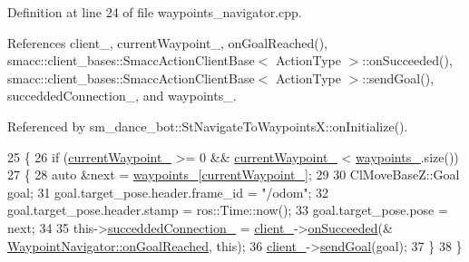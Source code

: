 Definition at line 24 of file waypoints\+\_\+navigator.\+cpp.



References client\+\_\+, current\+Waypoint\+\_\+, on\+Goal\+Reached(), smacc\+::client\+\_\+bases\+::\+Smacc\+Action\+Client\+Base$<$ Action\+Type $>$\+::on\+Succeeded(), smacc\+::client\+\_\+bases\+::\+Smacc\+Action\+Client\+Base$<$ Action\+Type $>$\+::send\+Goal(), succedded\+Connection\+\_\+, and waypoints\+\_\+.



Referenced by sm\+\_\+dance\+\_\+bot\+::\+St\+Navigate\+To\+Waypoints\+X\+::on\+Initialize().


\begin{DoxyCode}
25 \{
26   \textcolor{keywordflow}{if} (\hyperlink{classmove__base__z__client_1_1WaypointNavigator_a7da763128724f7b08c32c79cb3a88934}{currentWaypoint\_} >= 0 && \hyperlink{classmove__base__z__client_1_1WaypointNavigator_a7da763128724f7b08c32c79cb3a88934}{currentWaypoint\_} < 
      \hyperlink{classmove__base__z__client_1_1WaypointNavigator_a83e4e39987eaf1c8856d32d581eb4cd0}{waypoints\_}.size())
27   \{
28     \textcolor{keyword}{auto} &next = \hyperlink{classmove__base__z__client_1_1WaypointNavigator_a83e4e39987eaf1c8856d32d581eb4cd0}{waypoints\_}[\hyperlink{classmove__base__z__client_1_1WaypointNavigator_a7da763128724f7b08c32c79cb3a88934}{currentWaypoint\_}];
29 
30     ClMoveBaseZ::Goal goal;
31     goal.target\_pose.header.frame\_id = \textcolor{stringliteral}{"/odom"};
32     goal.target\_pose.header.stamp = ros::Time::now();
33     goal.target\_pose.pose = next;
34 
35     this->\hyperlink{classmove__base__z__client_1_1WaypointNavigator_a139d492345875777d9c9a79f9b2d494b}{succeddedConnection\_} = \hyperlink{classmove__base__z__client_1_1WaypointNavigator_aadb289ffdaeda3a751fe569a2ee84c48}{client\_}->\hyperlink{classsmacc_1_1client__bases_1_1SmaccActionClientBase_af6d77c27d21b2e4f621f53c5f1df088b}{onSucceeded}(&
      \hyperlink{classmove__base__z__client_1_1WaypointNavigator_ae4c5a879ff016f197c1cec54b2adaa1b}{WaypointNavigator::onGoalReached}, \textcolor{keyword}{this});
36     \hyperlink{classmove__base__z__client_1_1WaypointNavigator_aadb289ffdaeda3a751fe569a2ee84c48}{client\_}->\hyperlink{classsmacc_1_1client__bases_1_1SmaccActionClientBase_a9c47a5094ac8afb01680307fe5eca922}{sendGoal}(goal);
37   \}
38 \}
\end{DoxyCode}


